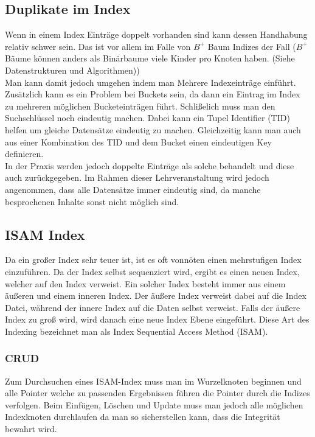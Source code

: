 \documentclass{article}
\begin{document}
	\subsection{Duplikate im Index}
	Wenn in einem Index Einträge doppelt vorhanden sind kann dessen Handhabung relativ schwer sein. Das ist vor allem im Falle von $B^+$ Baum Indizes der Fall ($B^+$ Bäume können anders als Binärbaume viele Kinder pro Knoten haben. (Siehe Datenstrukturen und Algorithmen)) \\
	Man kann damit jedoch umgehen indem man Mehrere Indexeinträge einführt. Zusätzlich kann es ein Problem bei Buckets sein, da dann ein Eintrag im Index zu mehreren möglichen Bucketeinträgen führt. Schlißelich muss man den Suchschlüssel noch eindeutig machen. Dabei kann ein Tupel Identifier (TID) helfen um gleiche Datensätze eindeutig zu machen. Gleichzeitig kann man auch aus einer Kombination des TID und dem Bucket einen eindeutigen Key definieren. \\
	In der Praxis werden jedoch doppelte Einträge als solche behandelt und diese auch zurückgegeben. Im Rahmen dieser Lehrveranstaltung wird jedoch angenommen, dass alle Datensätze immer eindeutig sind, da manche besprochenen Inhalte sonst nicht möglich sind.
	\subsection{ISAM Index}
	Da ein großer Index sehr teuer ist, ist es oft vonnöten einen mehrstufigen Index einzuführen. Da der Index selbst sequenziert wird, ergibt es einen neuen Index, welcher auf den Index verweist. Ein solcher Index besteht immer aus einem äußeren und einem inneren Index. Der äußere Index verweist dabei auf die Index Datei, während der innere Index auf die Daten selbst verweist. Falls der äußere Index zu groß wird, wird danach eine neue Index Ebene eingeführt. Diese Art des Indexing bezeichnet man als Index Sequential Access Method (ISAM).
	\subsubsection{CRUD}
	Zum Durchsuchen eines ISAM-Index muss man im Wurzelknoten beginnen und alle Pointer welche zu passenden Ergebnissen führen die Pointer durch die Indizes verfolgen. Beim Einfügen, Löschen und Update muss man jedoch alle möglichen Indexknoten durchlaufen da man so sicherstellen kann, dass die Integrität bewahrt wird.
\end{document}
